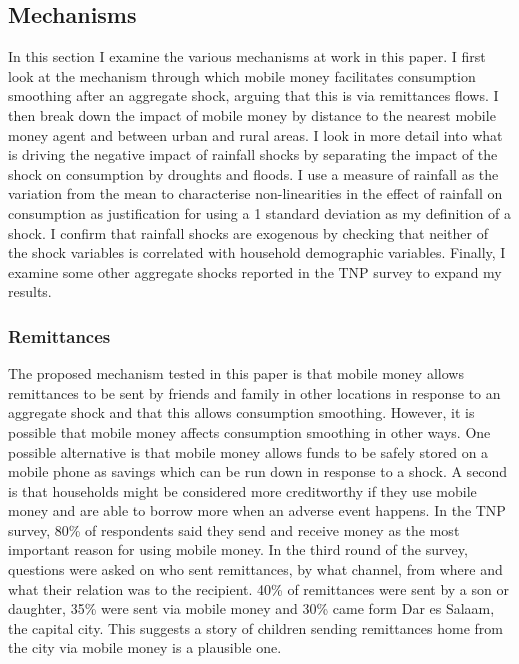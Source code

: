 \subsection{Mechanisms}
In this section I examine the various mechanisms at work in this paper. I first look at the mechanism through which mobile money facilitates consumption smoothing after an aggregate shock, arguing that this is via remittances flows. I then break down the impact of mobile money by distance to the nearest mobile money agent and between urban and rural areas. I look in more detail into what is driving the negative impact of rainfall shocks by separating the impact of the shock on consumption by droughts and floods. I use a measure of rainfall as the variation from the mean to characterise non-linearities in the effect of rainfall on consumption as justification for using a 1 standard deviation as my definition of a shock. I confirm that rainfall shocks are exogenous by checking that neither of the shock variables is correlated with household demographic variables.  Finally, I examine some other aggregate shocks reported in the TNP survey to expand my results.  

\subsubsection{Remittances}
The proposed mechanism tested in this paper is that mobile money allows remittances to be sent by friends and family in other locations in response to an aggregate shock and that this allows consumption smoothing. However, it is possible that mobile money affects consumption smoothing in other ways. One possible alternative is that mobile money allows funds to be safely stored on a mobile phone as savings which can be run down in response to a shock. A second is that households might be considered more creditworthy if they use mobile money and are able to borrow more when an adverse event happens. In the TNP survey, 80\% of respondents said they send and receive money as the most important reason for using mobile money. In the third round of the survey, questions were asked on who sent remittances, by what channel, from where and what their relation was to the recipient. 40\% of remittances were sent by a son or daughter, 35\% were sent via mobile money and 30\% came form Dar es Salaam, the capital city. This suggests a story of children sending remittances home from the city via mobile money is a plausible one.  

